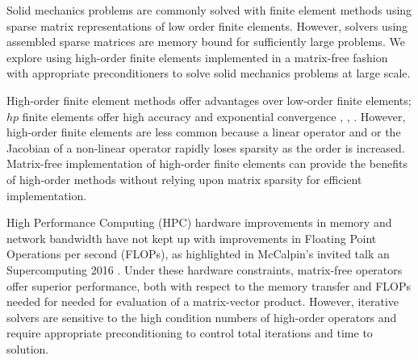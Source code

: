 Solid mechanics problems are commonly solved with finite element methods using sparse matrix representations of low order finite elements.
However, solvers using assembled sparse matrices are memory bound for sufficiently large problems.
We explore using high-order finite elements implemented in a matrix-free fashion with appropriate preconditioners to solve solid mechanics problems at large scale.

High-order finite element methods offer advantages over low-order finite elements; $hp$ finite elements offer high accuracy and exponential convergence \cite{demkowicz1989toward}, \cite{oden1989toward}, \cite{rachowicz1989toward}.
However, high-order finite elements are less common because a linear operator and or the Jacobian of a non-linear operator rapidly loses sparsity as the order is increased.
Matrix-free implementation of high-order finite elements can provide the benefits of high-order methods without relying upon matrix sparsity for efficient implementation.

High Performance Computing (HPC) hardware improvements in memory and network bandwidth have not kept up with improvements in Floating Point Operations per second (FLOPs), as highlighted in McCalpin's invited talk an Supercomputing 2016 \cite{mccalpin2016memory}.
Under these hardware constraints, matrix-free operators offer superior performance, both with respect to the memory transfer and FLOPs needed for needed for evaluation of a matrix-vector product.
However, iterative solvers are sensitive to the high condition numbers of high-order operators and require appropriate preconditioning to control total iterations and time to solution.
